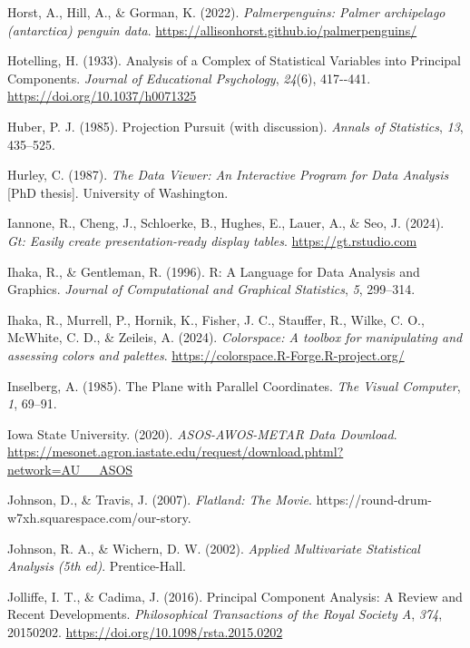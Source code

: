 \documentclass[
  letterpaper,
]{krantz}
\newlength{\cslhangindent}
\newenvironment{CSLReferences}[2] %
 {\begin{list}{}{%
  \setlength{\itemindent}{0pt}
  \setlength{\leftmargin}{0pt}
  \setlength{\parsep}{0pt}
  \ifodd #1
   \setlength{\leftmargin}{\cslhangindent}
   \setlength{\itemindent}{-1\cslhangindent}
  \fi
  \setlength{\itemsep}{#2\baselineskip}}}
 {\end{list}}
\begin{document}
\begin{CSLReferences}{1}{0}
Horst, A., Hill, A., \& Gorman, K. (2022). \emph{Palmerpenguins: Palmer
archipelago (antarctica) penguin data}.
\url{https://allisonhorst.github.io/palmerpenguins/}

Hotelling, H. (1933). Analysis of a {C}omplex of {S}tatistical
{V}ariables into {P}rincipal {C}omponents. \emph{Journal of Educational
Psychology}, \emph{24}(6), 417-\/-441.
\url{https://doi.org/10.1037/h0071325}

Huber, P. J. (1985). {P}rojection {P}ursuit (with discussion).
\emph{Annals of Statistics}, \emph{13}, 435--525.

Hurley, C. (1987). \emph{The {D}ata {V}iewer: An {I}nteractive {P}rogram
for {D}ata {A}nalysis} {[}PhD thesis{]}. University of Washington.

Iannone, R., Cheng, J., Schloerke, B., Hughes, E., Lauer, A., \& Seo, J.
(2024). \emph{Gt: Easily create presentation-ready display tables}.
\url{https://gt.rstudio.com}

Ihaka, R., \& Gentleman, R. (1996). R: {A} {L}anguage for {D}ata
{A}nalysis and {G}raphics. \emph{Journal of Computational and Graphical
Statistics}, \emph{5}, 299--314.

Ihaka, R., Murrell, P., Hornik, K., Fisher, J. C., Stauffer, R., Wilke,
C. O., McWhite, C. D., \& Zeileis, A. (2024). \emph{Colorspace: A
toolbox for manipulating and assessing colors and palettes}.
\url{https://colorspace.R-Forge.R-project.org/}

Inselberg, A. (1985). {T}he {P}lane with {P}arallel {C}oordinates.
\emph{The Visual Computer}, \emph{1}, 69--91.

Iowa State University. (2020). \emph{ASOS-AWOS-METAR {D}ata {D}ownload}.
\url{https://mesonet.agron.iastate.edu/request/download.phtml?network=AU__ASOS}

Johnson, D., \& Travis, J. (2007). \emph{Flatland: The {M}ovie}.
https://round-drum-w7xh.squarespace.com/our-story.

Johnson, R. A., \& Wichern, D. W. (2002). \emph{Applied {M}ultivariate
{S}tatistical {A}nalysis (5th ed)}. Prentice-Hall.

Jolliffe, I. T., \& Cadima, J. (2016). Principal {C}omponent {A}nalysis:
A {R}eview and {R}ecent {D}evelopments. \emph{Philosophical Transactions
of the Royal Society A}, \emph{374}, 20150202.
\url{https://doi.org/10.1098/rsta.2015.0202}


\end{CSLReferences}
\end{document}
